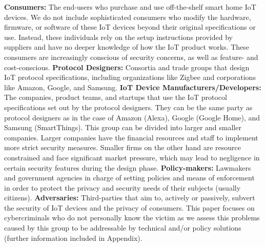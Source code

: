 {\bf Consumers:} The end-users who purchase and use off-the-shelf smart home IoT devices. We do not include sophisticated consumers who modify the hardware, firmware, or software of these IoT devices beyond their original specifications or use. Instead, these individuals rely on the setup instructions provided by suppliers and have no deeper knowledge of how the IoT product works. These consumers are increasingly conscious of security concerns, as well as feature- and cost-conscious.
{\bf Protocol Designers:} Consortia and trade groups that design IoT protocol specifications, including organizations like Zigbee and corporations like Amazon, Google, and Samsung.
{\bf IoT Device Manufacturers/Developers:} The companies, product teams, and startups that use the IoT protocol specifications set out by the protocol designers. They can be the same party as protocol designers as in the case of Amazon (Alexa), Google (Google Home), and Samsung (SmartThings). This group can be divided into larger and smaller companies. Larger companies have the financial resources and staff to implement more strict security measures. Smaller firms on the other hand are resource constrained and face significant market pressure, which may lead to negligence in certain security features during the design phase. 
{\bf Policy-makers:} Lawmakers and government agencies in charge of setting policies and means of enforcement in order to protect the privacy and security needs of their subjects (usually citizens).
{\bf Adversaries:} Third-parties that aim to, actively or passively, subvert the security of IoT devices and the privacy of consumers. This paper focuses on cybercriminals who do not personally know the victim as we assess this problems caused by this group to be addressable by technical and/or policy solutions (further information included in Appendix).



